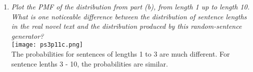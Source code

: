 \documentclass{article} %
\begin{document}
\begin{enumerate}
\begin{enumerate}
		\item \textit{Plot the PMF of the distribution from part (b), from length 1 up to length 10. What is one noticeable difference between the distribution of sentence lengths in the real novel text and the distribution produced by this random-sentence generator?}\\
		\texttt{[image: ps3p11c.png]}\\
		The probabilities for sentences of lengths 1 to 3 are much different. For sentence lenths 3 - 10, the probabilities are similar.
	
	\end{enumerate}
	
\end{enumerate}
\end{document}
